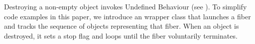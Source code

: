 \newpage
{}\label{autocancel}

Destroying a non-empty \fiber object invokes Undefined Behaviour
(see ). To simplify code examples in this paper, we
introduce an  wrapper class that launches a fiber and tracks
the sequence of \fiber objects representing that fiber. When
an  object is destroyed, it sets a stop flag and loops until
the fiber voluntarily terminates.


